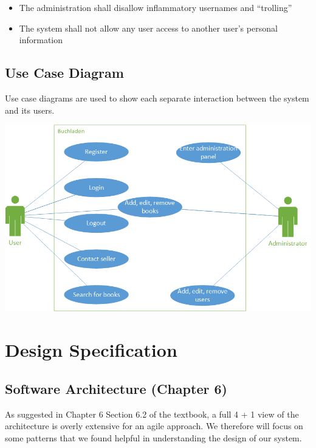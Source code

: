 \documentclass[11pt]{article}
\begin{document}
\begin{itemize}
\item The administration shall disallow inflammatory usernames and ``trolling''
\item The system shall not allow any user access to another user’s personal information
\end{itemize}

\subsection{Use Case Diagram}

Use case diagrams are used to show each separate interaction between
the system and its users.

\vspace{0.2in}

\centerline{\includegraphics[scale=0.7]{./images/use-case.png}} 


\newpage
\section{Design Specification}
\label{sec:design-specs}

\subsection{Software Architecture (Chapter 6)}
\label{sec:software-architecture}

	As suggested in Chapter 6 Section 6.2 of the textbook, a full 4 + 1 view of the architecture is overly extensive for an agile approach.
	We therefore will focus on some patterns that we found helpful in understanding the design of our system.
\end{document}
